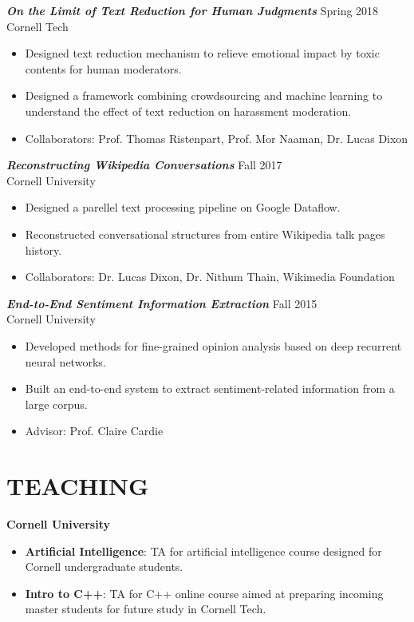 \documentclass[margin, 10pt]{res} %
\begin{document}
\begin{resume}
{\sl \textbf{On the Limit of Text Reduction for Human Judgments}} \hfill Spring 2018\\
Cornell Tech 
\begin{itemize}
\item Designed text reduction mechanism to relieve emotional impact by toxic contents for human moderators.
\item Designed a framework combining crowdsourcing and machine learning to understand the effect of text reduction on harassment moderation.
\item Collaborators: Prof. Thomas Ristenpart, Prof. Mor Naaman, Dr. Lucas Dixon
\end{itemize}

{\sl \textbf{Reconstructing Wikipedia Conversations}} \hfill Fall 2017\\
Cornell University
\begin{itemize}
\item Designed a parellel text processing pipeline on Google Dataflow.
\item Reconstructed conversational structures from entire Wikipedia talk pages history. 
\item Collaborators: Dr. Lucas Dixon, Dr. Nithum Thain, Wikimedia Foundation
\end{itemize}

{\sl \textbf{End-to-End Sentiment Information Extraction}} \hfill Fall 2015\\
Cornell University
\begin{itemize}
\item Developed methods for fine-grained opinion analysis based on deep recurrent
  neural networks.
\item Built an end-to-end system to extract sentiment-related information
  from a large corpus.
\item Advisor: Prof. Claire Cardie
\end{itemize}

\section{TEACHING}
\textbf{Cornell University}
\begin{itemize}
\item \textbf{Artificial Intelligence}: TA for artificial intelligence course designed for Cornell undergraduate students.
\item \textbf{Intro to C++}: TA for C++ online course aimed at preparing incoming master students for future study in Cornell Tech. 
\end{itemize} 


\end{resume}
\end{document}

